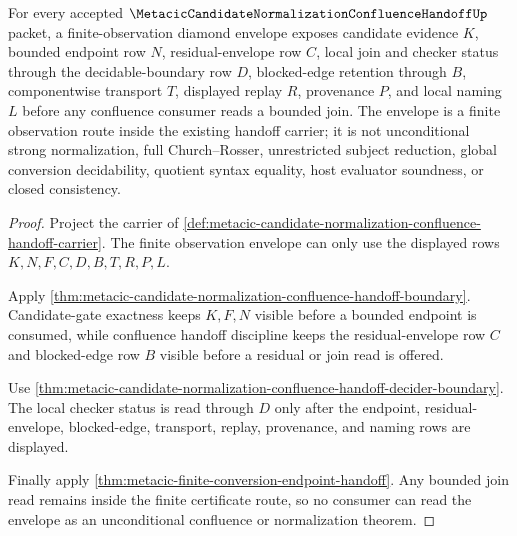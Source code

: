 \begin{theorem}
\label{thm:finite-observation-metacic-diamond-envelope-namecert-obligations}
For every accepted $\MetacicCandidateNormalizationConfluenceHandoffUp$ packet, a finite-observation diamond envelope exposes candidate evidence $K$, bounded endpoint row $N$, residual-envelope row $C$, local join and checker status through the decidable-boundary row $D$, blocked-edge retention through $B$, componentwise transport $T$, displayed replay $R$, provenance $P$, and local naming $L$ before any confluence consumer reads a bounded join. The envelope is a finite observation route inside the existing handoff carrier; it is not unconditional strong normalization, full Church--Rosser, unrestricted subject reduction, global conversion decidability, quotient syntax equality, host evaluator soundness, or closed consistency.
\end{theorem}
\begin{proof}
Project the carrier of \autoref{def:metacic-candidate-normalization-confluence-handoff-carrier}. The finite observation envelope can only use the displayed rows $K,N,F,C,D,B,T,R,P,L$.

Apply \autoref{thm:metacic-candidate-normalization-confluence-handoff-boundary}. Candidate-gate exactness keeps $K,F,N$ visible before a bounded endpoint is consumed, while confluence handoff discipline keeps the residual-envelope row $C$ and blocked-edge row $B$ visible before a residual or join read is offered.

Use \autoref{thm:metacic-candidate-normalization-confluence-handoff-decider-boundary}. The local checker status is read through $D$ only after the endpoint, residual-envelope, blocked-edge, transport, replay, provenance, and naming rows are displayed.

Finally apply \autoref{thm:metacic-finite-conversion-endpoint-handoff}. Any bounded join read remains inside the finite certificate route, so no consumer can read the envelope as an unconditional confluence or normalization theorem.
\end{proof}

